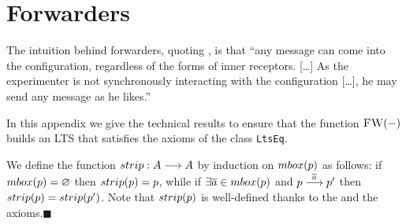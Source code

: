 \section{Forwarders}
\label{sec:appendix-forxarders}

The intuition behind forwarders, quoting \cite{DBLP:conf/ecoop/HondaT91},
is that ``any message can come into the configuration, regardless of the forms of
inner receptors. [\ldots] As the experimenter is not synchronously
interacting with the configuration [\ldots], he may send any message
as he likes.''

In this appendix we give the technical results to ensure that
the function $\textsc{FW}(-)$ builds an LTS that satisfies
the axioms of the class \texttt{LtsEq}.

  \newcommand{\stripSym}{\mathsf{strip}}
  \newcommand{\strip}[1]{\stripSym(#1)}

  \begin{definition}\label{def:strip-def}
    We define the function $\stripSym : \States \longrightarrow \States$ by induction on $
    \outputmultiset{ \server }$ as follows: if
    $\outputmultiset{\server}  = \varnothing $ then
    $\strip{\server} = \server$, while
    if $\exists \co{\aa} \in \outputmultiset{\server}$ and $p \mathrel{\overset{ \overline{a} }\longrightarrow} p'$ then
    $ \strip{ \server } =  \strip{ \server' } $.
    Note that $\strip{ \server }$ is well-defined thanks to the \outputdeterminacy
    and the \outputcommutativity axioms.\hfill$\blacksquare$
  \end{definition}


    





